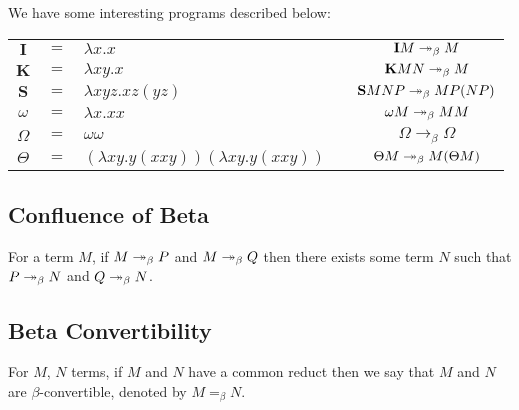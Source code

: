 We have some interesting programs described below:
\begin{center}
    \begin{tabular}{ c c l p{1cm} c }
        $\mathbf{I}$ & $=$ & $\lambda x.x$ 
        && $\mathbf{I} M \twoheadrightarrow_\beta M$ \\
        $\mathbf{K}$ & $=$ & $\lambda xy.x$ 
        && $\mathbf{K} MN \twoheadrightarrow_\beta M$ \\
        $\mathbf{S}$ & $=$ & $\lambda xyz.xz(yz)$ 
        && $\mathbf{S} MNP \twoheadrightarrow_\beta MP(NP)$ \\
        $\omega$ & $=$ & $\lambda x.xx$ 
        && $\omega M \twoheadrightarrow_\beta MM$ \\
        $\Omega$ & $=$ & $\omega\omega$ 
        && $\Omega \to_\beta \Omega$ \\
        $\Theta$ & $=$ & $(\lambda xy.y(xxy))(\lambda xy.y(xxy))$ 
        && $\Theta M \twoheadrightarrow_\beta M(\Theta M)$
    \end{tabular}
\end{center}

\subsection{Confluence of Beta}

For a term $M$, if $M \twoheadrightarrow_\beta P$ and
$M \twoheadrightarrow_\beta Q$ then there exists some
term $N$ such that $P \twoheadrightarrow_\beta N$ and
$Q \twoheadrightarrow_\beta N$.   

\subsection{Beta Convertibility}

For $M$, $N$ terms, if $M$ and $N$ have a common reduct then
we say that $M$ and $N$ are $\beta$-convertible, denoted by
$M =_\beta N$.